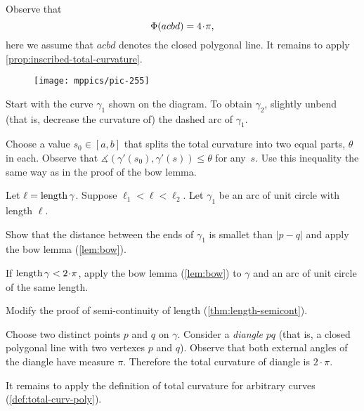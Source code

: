 Observe that 
\[\tc{acbd}=4\cdot\pi,\]
here we assume that $acbd$ denotes the closed polygonal line.
It remains to apply \ref{prop:inscribed-total-curvature}.

{

\begin{wrapfigure}{r}{22 mm}
\vskip-6mm
\centering
\texttt{[image: mppics/pic-255]}
\vskip0mm
\end{wrapfigure}

Start with the curve $\gamma_1$ shown on the diagram.
To obtain $\gamma_2$, slightly unbend (that is, decrease the curvature of) the dashed arc of $\gamma_1$.

}

Choose a value $s_0\in[a,b]$ that splits the total curvature into two equal parts, $\theta$ in each.
Observe that $\measuredangle(\gamma'(s_0),\gamma'(s))\le \theta$ for any~$s$.
Use this inequality the same way as in the proof of the bow lemma.

Let $\ell=\mathop{\rm length}\nolimits\gamma$.
Suppose $\ell_1<\ell<\ell_2$.
Let $\gamma_1$ be an arc of unit circle with length $\ell$.

Show that the distance between the ends of $\gamma_1$ is smallet than $|p-q|$ and apply the bow lemma (\ref{lem:bow}).


 If $\length\gamma<2\cdot\pi$, apply the bow lemma (\ref{lem:bow}) to $\gamma$ and an arc of unit circle of the same length.

 Modify the proof of semi-continuity of length (\ref{thm:length-semicont}).

Choose two distinct points $p$ and $q$ on $\gamma$.
Consider a \emph{diangle} $pq$ (that is, a closed polygonal line with two vertexes $p$ and $q$).
Observe that both external angles of the diangle have measure $\pi$.
Therefore the total curvature of diangle is $2\cdot \pi$.

It remains to apply the definition of total curvature for arbitrary curves (\ref{def:total-curv-poly}).

